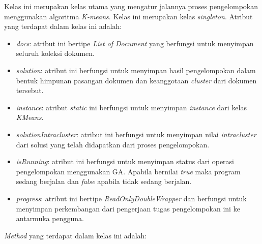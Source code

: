 Kelas ini merupakan kelas utama yang mengatur jalannya proses pengelompokan menggunakan algoritma \textit{K-means}. Kelas ini merupakan kelas \textit{singleton}. Atribut yang terdapat dalam kelas ini adalah:

\begin{itemize}
	\item \textit{docs}: atribut ini bertipe \textit{List of Document} yang berfungsi untuk menyimpan seluruh koleksi dokumen.
	\item \textit{solution}: atribut ini berfungsi untuk menyimpan hasil pengelompokan dalam bentuk himpunan pasangan dokumen dan keanggotaan \textit{cluster} dari dokumen tersebut.
	\item \textit{instance}: atribut \textit{static} ini berfungsi untuk menyimpan \textit{instance} dari kelas \textit{KMeans}.
	\item \textit{solutionIntracluster}: atribut ini berfungsi untuk menyimpan nilai \textit{intracluster} dari solusi yang telah didapatkan dari proses pengelompokan.
	\item \textit{isRunning}: atribut ini berfungsi untuk menyimpan status dari operasi pengelompokan menggunakan GA. Apabila bernilai \textit{true} maka program sedang berjalan dan \textit{false} apabila tidak sedang berjalan.
	\item \textit{progress}: atribut ini bertipe \textit{ReadOnlyDoubleWrapper} dan berfungsi untuk menyimpan perkembangan dari pengerjaan tugas pengelompokan ini ke antarmuka pengguna.
\end{itemize}

\textit{Method} yang terdapat dalam kelas ini adalah:

